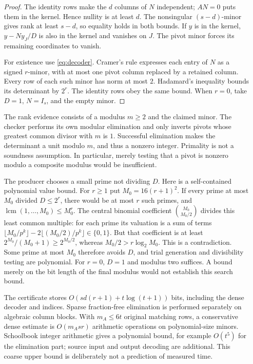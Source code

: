 \documentclass[11pt,a4paper]{article}
\theoremstyle{definition}
\begin{document}
\begin{proof}
The identity rows make the $d$ columns of $N$ independent; $AN=0$ puts them in
the kernel.  Hence nullity is at least $d$.  The nonsingular $(s-d)$-minor gives
rank at least $s-d$, so equality holds in both bounds.  If $y$ is in the
kernel, $y-Ny_J/D$ is also in the kernel and vanishes on $J$.  The pivot minor
forces its remaining coordinates to vanish.

For existence use \cref{eq:decoder}.  Cramer's rule expresses each entry of
$N$ as a signed $r$-minor, with at most one pivot column replaced by a retained
column.  Every row of each such minor has norm at most $2$.  Hadamard's
inequality bounds its determinant by $2^r$.  The identity rows obey the same
bound.  When $r=0$, take $D=1$, $N=I_s$, and the empty minor.
\end{proof}

The rank evidence consists of a modulus $m\ge2$ and the claimed minor.  The
checker performs its own modular elimination and only inverts pivots whose
greatest common divisor with $m$ is $1$.  Successful elimination makes the
determinant a unit modulo $m$, and thus a nonzero integer.  Primality is not a
soundness assumption.  In particular, merely testing that a pivot is nonzero
modulo a composite modulus would be insufficient.

The producer chooses a small prime not dividing $D$.  Here is a self-contained
polynomial value bound.  For $r\ge1$ put $M_0=16(r+1)^2$.  If every prime at
most $M_0$ divided $D\le2^r$, there would be at most $r$ such primes, and
$\operatorname{lcm}(1,\ldots,M_0)\le M_0^r$.  The central binomial coefficient
$\binom{M_0}{M_0/2}$ divides this least common multiple: for each prime its
valuation is a sum of terms
$\lfloor M_0/p^k\rfloor-2\lfloor(M_0/2)/p^k\rfloor\in\{0,1\}$.
But that coefficient is at least $2^{M_0}/(M_0+1)\ge2^{M_0/2}$, whereas
$M_0/2>r\log_2 M_0$.  This is a contradiction.  Some prime at most $M_0$
therefore avoids $D$, and trial generation and divisibility testing are
polynomial.  For $r=0$, $D=1$ and modulus two suffices.  A bound merely on
the bit length of the final modulus would not establish this search bound.

The certificate stores $O(sd(r+1)+t\log(t+1))$ bits, including the dense
decoder and indices.  Sparse fraction-free elimination is performed separately
on algebraic column blocks.  With $m_A\le6t$ original matching rows, a
conservative dense estimate is $O(m_A s r)$ arithmetic operations on
polynomial-size minors.  Schoolbook
integer arithmetic gives a polynomial bound, for example $O(t^5)$ for the
elimination part; source input and output decoding are additional.  This
coarse upper bound is deliberately not a prediction of measured time.
\end{document}
